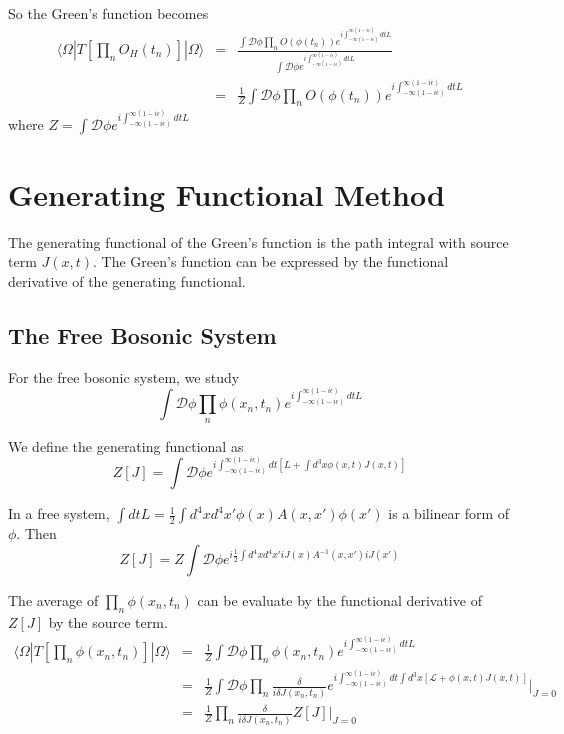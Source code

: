 \documentclass[12pt]{book}
\begin{document}
	So the Green's function becomes
	\begin{eqnarray}
		\langle \Omega|T[\prod_nO_H(t_n)]|\Omega\rangle&=&\frac{\int \mathcal D \phi\prod_n O(\phi(t_n))e^{i\int_{-\infty(1-i\epsilon)}^{\infty(1-i\epsilon)}dtL}}{\int \mathcal D \phi e^{i\int_{-\infty(1-i\epsilon)}^{\infty(1-i\epsilon)}dtL}}\\
		&=&\frac 1Z\int \mathcal D \phi\prod_n O(\phi(t_n))e^{i\int_{-\infty(1-i\epsilon)}^{\infty(1-i\epsilon)}dtL}
	\end{eqnarray}
	where $Z=\int \mathcal D \phi e^{i\int_{-\infty(1-i\epsilon)}^{\infty(1-i\epsilon)}dtL}$
	
	
	\section{Generating Functional Method}
	
	The generating functional of the Green's function is the path integral with source term $J(x,t)$. The Green's function can be expressed by the functional derivative of the generating functional. 
	
	\subsection{The Free Bosonic System}
	
	For the free bosonic system, we study
	\begin{equation}
		\int \mathcal D \phi\prod_n \phi(x_n,t_n)e^{i\int_{-\infty(1-i\epsilon)}^{\infty(1-i\epsilon)}dtL}
	\end{equation}
	
	We define the generating functional as
	\begin{equation}
		Z[J]=\int \mathcal D \phi e^{i\int_{-\infty(1-i\epsilon)}^{\infty(1-i\epsilon)}dt[L+\int d^3x\phi(x,t)J(x,t)]}
	\end{equation}
	
	In a free system, $\int dt L=\frac 12\int d^4xd^4x'\phi(x)A(x,x')\phi(x')$ is a bilinear form of $\phi$. Then
	\begin{equation}
		Z[J]=Z\int \mathcal D \phi e^{i\frac 12\int d^4xd^4x'iJ(x)A^{-1}(x,x')iJ(x')}
	\end{equation}
	
	The average of $\prod_n \phi(x_n,t_n)$ can be evaluate by the functional derivative of $Z[J]$ by the source term.
	\begin{eqnarray}
		\langle \Omega|T[\prod_n\phi(x_n,t_n)]|\Omega\rangle&=&\frac 1Z\int \mathcal D \phi\prod_n \phi(x_n,t_n)e^{i\int_{-\infty(1-i\epsilon)}^{\infty(1-i\epsilon)}dtL}\\
		&=&\frac 1Z\int \mathcal D \phi\prod_n \frac\delta{i\delta J(x_n,t_n)}e^{i\int_{-\infty(1-i\epsilon)}^{\infty(1-i\epsilon)}dt\int d^3x[\mathcal L+\phi(x,t)J(x,t)]}\Big|_{J=0}\\
		&=&\frac 1Z\prod_n \frac\delta{i\delta J(x_n,t_n)}Z[J]\Big|_{J=0}
	\end{eqnarray}
	
\end{document}
